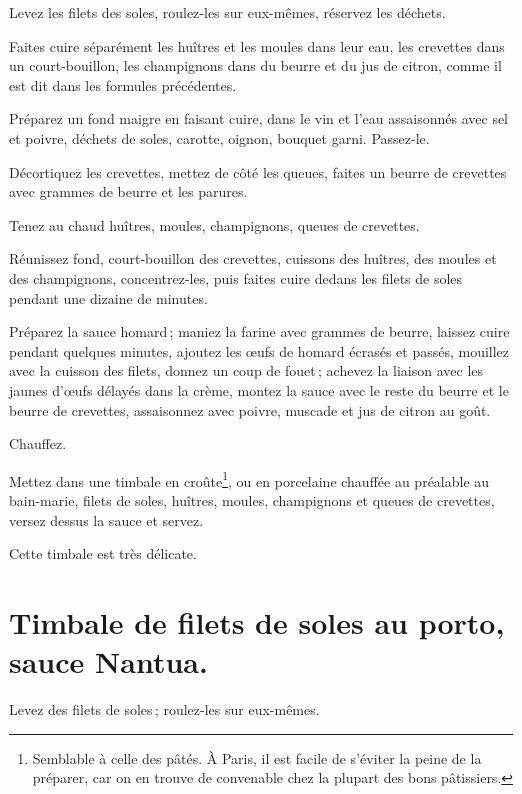 Levez les filets des soles, roulez-les sur eux-mêmes, réservez les déchets.

Faites cuire séparément les huîtres et les moules dans leur eau, les crevettes
dans un court-bouillon, les champignons dans du beurre et du jus de citron,
comme il est dit dans les formules précédentes.

Préparez un fond maigre en faisant cuire, dans le vin et l'eau assaisonnés avec
sel et poivre, déchets de soles, carotte, oignon, bouquet garni. Passez-le.

Décortiquez les crevettes, mettez de côté les queues, faites un beurre de
crevettes avec {\mmm} grammes de beurre et les parures.

Tenez au chaud huîtres, moules, champignons, queues de crevettes.

Réunissez fond, court-bouillon des crevettes, cuissons des huîtres, des moules
et des champignons, concentrez-les, puis faites cuire dedans les filets de soles
pendant une dizaine de minutes.

Préparez la sauce homard ; maniez la farine avec {\mmm} grammes de beurre, laissez
cuire pendant quelques minutes, ajoutez les œufs de homard écrasés et passés,
mouillez avec la cuisson des filets, donnez un coup de fouet ; achevez la
liaison avec les jaunes d'œufs délayés dans la crème, montez la sauce avec le
reste du beurre et le beurre de crevettes, assaisonnez avec poivre, muscade et
jus de citron au goût.

Chauffez.

Mettez dans une timbale en croûte\footnote{Semblable à celle des pâtés.
À Paris, il est facile de s'éviter la peine de la préparer, car on en trouve de
convenable chez la plupart des bons pâtissiers.}, ou en porcelaine chauffée au
préalable au bain-marie, filets de soles, huîtres, moules, champignons et
queues de crevettes, versez dessus la sauce et servez.

Cette timbale est très délicate.

\section*{\centering Timbale de filets de soles au porto, sauce Nantua.}

Levez des filets de soles ; roulez-les sur eux-mêmes.

